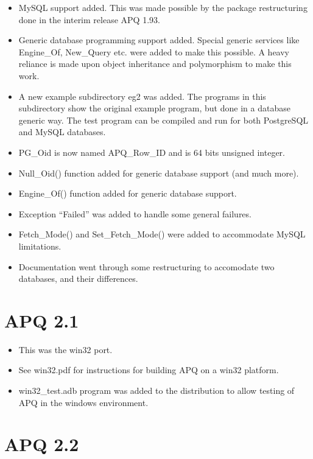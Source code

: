 \documentclass[english,letterpaper]{book}
\begin{document}
\begin{itemize}
   \item MySQL support added. This was made possible by the package restructuring
         done in the interim release APQ 1.93.
   \item Generic database programming support added. Special generic services
         like Engine\_Of, New\_Query etc. were added to make this possible.
         A heavy reliance is made upon object inheritance and polymorphism
         to make this work.
   \item A new example subdirectory eg2 was added. The programs in this subdirectory
         show the original example program, but done in a database generic
         way. The test program can be compiled and run for both PostgreSQL
         and MySQL databases.
   \item PG\_Oid is now named APQ\_Row\_ID and is 64 bits unsigned integer.
   \item Null\_Oid() function added for generic database support (and much
         more).
   \item Engine\_Of() function added for generic database support.
   \item Exception {}``Failed'' was added to handle some general failures.
   \item Fetch\_Mode() and Set\_Fetch\_Mode() were added to accommodate MySQL
         limitations.
   \item Documentation went through some restructuring to accomodate two databases,
         and their differences.
\end{itemize}

\section*{APQ 2.1}

\begin{itemize}
   \item This was the win32 port.
   \item See win32.pdf for instructions for building APQ on a win32 platform.
   \item win32\_test.adb program was added to the distribution to allow testing
         of APQ in the windows environment.
\end{itemize}

\section*{APQ 2.2}
\end{document}
